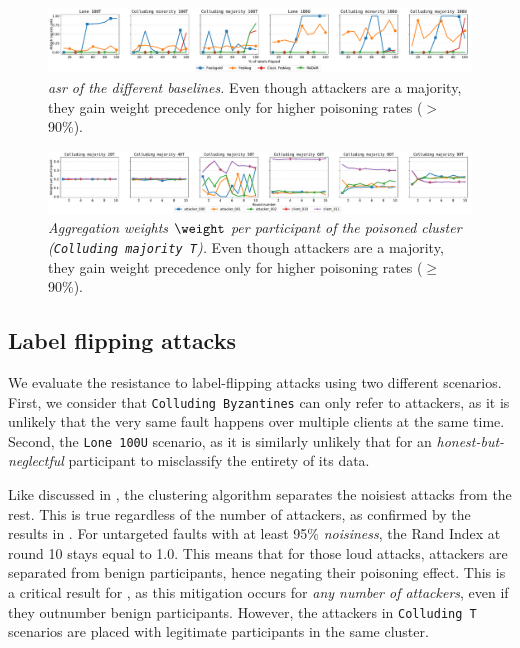 \begin{figure} %
  \centering 
  \includegraphics[width=\linewidth]{figures/poisoning/asr_multiple_baselines.pdf}    
  \caption{
    \emph{\Acrfull{asr} of the different baselines.}
    Even though attackers are a majority, they gain weight precedence only for higher poisoning rates ($>$90\%).  
  }
  \label{fig:asr_multiple_baselines}
\end{figure}

\begin{figure} %
  \centering     
    \includegraphics[width=\linewidth]{figures/reput/majority_attackers_targeted_multiple_percents.pdf}    
  \caption{
    \emph{Aggregation weights $\weight$ per participant of the poisoned cluster (\texttt{Colluding majority T}).}
    Even though attackers are a majority, they gain weight precedence only for higher poisoning rates ($\ge$90\%).  
  }
  \label{fig:majority_targeted_flipping_effect}
\end{figure}


\subsection{Label flipping attacks\label{sec:radar.eval.results.flipping}}

We evaluate the resistance to label-flipping attacks using two different scenarios.
First, we consider that \texttt{Colluding Byzantines} can only refer to attackers, as it is unlikely that the very same fault happens over multiple clients at the same time.
Second, the \texttt{Lone~100U} scenario, as it is similarly unlikely that for an \emph{honest-but-neglectful} participant to misclassify the entirety of its data.

Like discussed in , the clustering algorithm separates the noisiest attacks from the rest.
This is true regardless of the number of attackers, as confirmed by the results in .
For untargeted faults with at least 95\% \emph{noisiness}, the Rand Index at round 10 stays equal to 1.0.
This means that for those loud attacks, attackers are separated from benign participants, hence negating their poisoning effect.
This is a critical result for \thecontrib, as this mitigation occurs for \emph{any number of attackers}, even if they outnumber benign participants.
However, the attackers in \texttt{Colluding T} scenarios are placed with legitimate participants in the same cluster. 


